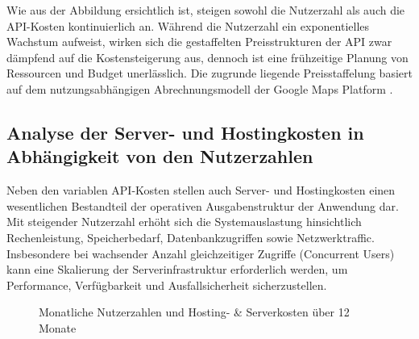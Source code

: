 Wie aus der Abbildung ersichtlich ist, steigen sowohl die Nutzerzahl als auch die API-Kosten kontinuierlich an. Während die Nutzerzahl ein exponentielles Wachstum aufweist, wirken sich die gestaffelten Preisstrukturen der API zwar dämpfend auf die Kostensteigerung aus, dennoch ist eine frühzeitige Planung von Ressourcen und Budget unerlässlich. Die zugrunde liegende Preisstaffelung basiert auf dem nutzungsabhängigen Abrechnungsmodell der Google Maps Platform \cite{Google_Maps_Pricing2026}.

\subsection{Analyse der Server- und Hostingkosten in Abhängigkeit von den Nutzerzahlen}

Neben den variablen API-Kosten stellen auch Server- und Hostingkosten einen wesentlichen Bestandteil der operativen Ausgabenstruktur der Anwendung dar. Mit steigender Nutzerzahl erhöht sich die Systemauslastung hinsichtlich Rechenleistung, Speicherbedarf, Datenbankzugriffen sowie Netzwerktraffic. Insbesondere bei wachsender Anzahl gleichzeitiger Zugriffe (Concurrent Users) kann eine Skalierung der Serverinfrastruktur erforderlich werden, um Performance, Verfügbarkeit und Ausfallsicherheit sicherzustellen.

\begin{figure}[H]
\centering
{}
\caption{Monatliche Nutzerzahlen und Hosting- \& Serverkosten über 12 Monate}
\end{figure}

